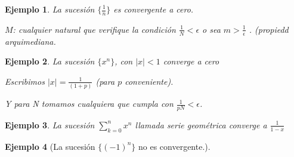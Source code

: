 \message{ !name(analisis-mat.tex)}\documentclass[12pt,a4paper]{article}
\newtheorem{ejs}{Ejemplo}[section]
\begin{document}
\begin{ejs}{La sucesi\'on \( \{ \frac{1}{n}\} \)} es convergente a
  cero.

\( M \): cualquier natural que verifique la condici\'on \( \frac{1}{N}
< \epsilon\) o sea \( m > \frac{1}{\epsilon} \) . (propiedd arquimediana.

\end{ejs}
\hspace{1mm}
\begin{ejs}{La sucesi\'on \( \{ x^n \} \), con \( |x|< 1 \) converge a
  cero}

Escribimos \( |x| = \frac{1}{(1+p)} \) (para \( p \) conveniente).

Y para N tomamos cualquiera que cumpla con \( \frac{1}{pN} < \epsilon \).

\end{ejs}
\hspace{1mm}
\begin{ejs}{La sucesi\'on \( \sum_{k=0}^n x^n \) llamada \emph{serie
geom\'etrica} converge a \( \frac{1}{1-x} \)  }


\end{ejs}
\hspace{1mm}
\begin{ejs}[La sucesi\'on \( \{(-1)^n\} \) no es convergente.]


\end{ejs}
\hspace{1mm}
\end{document}
